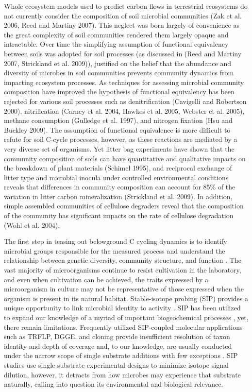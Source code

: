 Whole ecosystem models used to predict carbon flows in terrestrial ecosystems do not currently consider the composition of soil microbial communities (Zak et al. 2006, Reed and Martiny 2007). This neglect was born largely of convenience as the great complexity of soil communities rendered them largely opaque and intractable. Over time the simplifying assumption of functional equivalency between soils was adopted for soil processes (as discussed in (Reed and Martiny 2007, Strickland et al. 2009)), justified on the belief that the abundance and diversity of microbes in soil communities prevents community dynamics from impacting ecosystem processes. As techniques for assessing microbial community composition have improved the hypothesis of functional equivalency has been rejected for various soil processes such as denitrification (Cavigelli and Robertson 2000), nitrification (Carney et al. 2004, Hawkes et al. 2005, Webster et al. 2005), methane consumption (Gulledge et al. 1997), and nitrogen fixation (Hsu and Buckley 2009). The assumption of functional equivalence is more difficult to refute for soil C-cycle processes, however, as these reactions are mediated by a very diverse set of organisms. Yet litter bag experiments have shown that the community composition of soils can have quantitative and qualitative impacts on the breakdown of plant materials (Schimel 1995), and reciprocal exchange of litter type and microbial inocula under controlled environmental conditions reveals that differences in community composition can account for 85\% of the variation in litter carbon mineralization (Strickland et al. 2009). In addition, simple assembled communities of cellulose degraders reveal that the composition of the community has significant impacts on the rate of cellulose degradation (Wohl et al. 2004).

The first step in teasing out belowground C cycling dynamics is to identify microbial groups responsible for the measured process and understand the relationship between genetic diversity, community structure, and function \cite{O_Donnell_2002}. The vast majority of microorganisms continue to resist cultivation in the laboratory, and even when cultivation can be achieved, the traits expressed by a microorganism in culture may not be representative of those expressed when the organism is present in its natural habitat. Stable-isotope probing (SIP) provides a unique opportunity to link microbial identity to activity \cite{Chen_Murrell_2010}. SIP has been utilized to expand our knowledge of a myriad of important biogeochemical processes \cite{Chen_Murrell_2010}, yet, there remain limitations. Frequently utilized SIP-coupled molecular applications such as TRFLP, DGGE, and cloning provide insufficient resolution of taxon identity and depth of coverage and, to our knowledge, are usually conducted under the narrow scope of single substrate additions with few exceptions \cite{Lueders_2003,Chauhan_2009}. SIP studies use single substrate experimental designs to minimize isotope signal dilution, however, it detracts from how microbes may experience that substrate naturally, calling into question its environmental and biological relevance.

